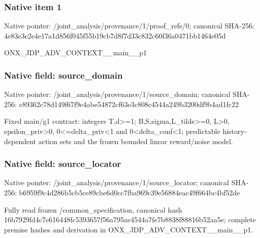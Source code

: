 \documentclass[10pt,a4paper]{article}
\begin{document}
\subsubsection{Native item 1}
Native pointer: /joint\_\allowbreak{}analysis/provenance/1/proof\_\allowbreak{}refs/0; canonical SHA-256: 4e83e3e2e4e17a1d856f045f55b19cb7d8f7d33c832c60f36a0471bb1464e05d

\begingroup\raggedright\sloppy ONX\_\allowbreak{}JDP\_\allowbreak{}ADV\_\allowbreak{}CONTEXT\_\allowbreak{}\_\allowbreak{}main\_\allowbreak{}\_\allowbreak{}p1\par\endgroup

\subsubsection{Native field: source\_\allowbreak{}domain}
Native pointer: /joint\_\allowbreak{}analysis/provenance/1/source\_\allowbreak{}domain; canonical SHA-256: c89362c78d149f67f9e4abe54872cf63e3c808c4544a249b3200df9b4ad1fc22

\begingroup\raggedright\sloppy Fixed main/\allowbreak{}g1 contract:\allowbreak{} integers T,\allowbreak{}d>=\allowbreak{}1;\allowbreak{} B,\allowbreak{}S,\allowbreak{}sigma,\allowbreak{}L\_\allowbreak{}tilde>=\allowbreak{}0,\allowbreak{} L>0,\allowbreak{} epsilon\_\allowbreak{}priv>0,\allowbreak{} 0<=\allowbreak{}delta\_\allowbreak{}priv<1 and 0<delta\_\allowbreak{}conf<1;\allowbreak{} predictable history-dependent action sets and the frozen bounded linear reward/\allowbreak{}noise model.\par\endgroup

\subsubsection{Native field: source\_\allowbreak{}locator}
Native pointer: /joint\_\allowbreak{}analysis/provenance/1/source\_\allowbreak{}locator; canonical SHA-256: b6959f9c4d286b5cb5ce89cbe6d0cc7fba969c39e56884eac49f664bc4bf52de

\begingroup\raggedright\sloppy Fully read frozen /\allowbreak{}common\_\allowbreak{}specification,\allowbreak{} canonical hash 16b7929fd4c7e616448fc5393657f56a795ae4544a7fe7b8838f88816b52aa5e;\allowbreak{} complete premise hashes and derivation in ONX\_\allowbreak{}JDP\_\allowbreak{}ADV\_\allowbreak{}CONTEXT\_\allowbreak{}\_\allowbreak{}main\_\allowbreak{}\_\allowbreak{}p1.\par\endgroup
\end{document}
